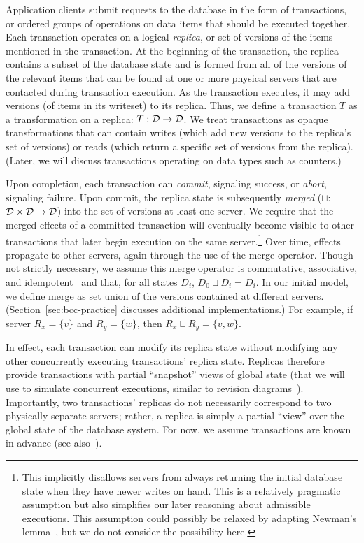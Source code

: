  Application clients
submit requests to the database in the form of transactions, or
ordered groups of operations on data items that should be executed
together. Each transaction operates on a logical \textit{replica}, or
set of versions of the items mentioned in the transaction. At the
beginning of the transaction, the replica contains a subset of the
database state and is formed from all of the versions of the relevant
items that can be found at one or more physical servers that are
contacted during transaction execution. As the transaction executes,
it may add versions (of items in its writeset) to its replica. Thus,
we define a transaction $T$ as a transformation on a replica: $T:
{\cal D}\rightarrow {\cal D}$. We treat transactions as opaque
transformations that can contain writes (which add new versions to the
replica's set of versions) or reads (which return a specific set of
versions from the replica). (Later, we will discuss transactions
operating on data types such as counters.)

Upon completion, each transaction can \textit{commit}, signaling
success, or \textit{abort}, signaling failure. Upon commit, the
replica state is subsequently \textit{merged} ($\sqcup$:${\cal D}
\times {\cal D} \rightarrow {\cal D}$) into the set of versions at
least one server. We require that the merged effects of a committed
transaction will eventually become visible to other transactions that
later begin execution on the same server.\footnote{This implicitly
  disallows servers from always returning the initial database state
  when they have newer writes on hand. This is a relatively pragmatic
  assumption but also simplifies our later reasoning about admissible
  executions. This assumption could possibly be relaxed by adapting
  Newman's lemma~\cite{obs-confluence}, but we do not consider the
  possibility here.}  Over time, effects propagate to other servers,
again through the use of the merge operator.  Though not strictly
necessary, we assume this merge operator is commutative, associative,
and idempotent~\cite{calm,crdt} and that, for all states $D_i$, $D_0
\sqcup D_i = D_i$.  In our initial model, we define
merge as set union of the versions contained at different servers.
(Section~\ref{sec:bcc-practice} discusses additional implementations.)
For example, if server $R_x = \{v\}$ and $R_y = \{w\}$, then $R_x
\sqcup R_y = \{v, w\}$.

In effect, each transaction can modify its replica state without
modifying any other concurrently executing transactions' replica
state. Replicas therefore provide transactions with partial
``snapshot'' views of global state (that we will use to simulate
concurrent executions, similar to revision
diagrams~\cite{ec-txns}). Importantly, two transactions' replicas do
not necessarily correspond to two physically separate servers; rather,
a replica is simply a partial ``view'' over the global state of the
database system. For now, we assume transactions are known in advance
(see also~).


